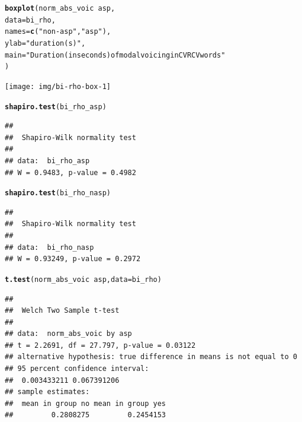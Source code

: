 \documentclass[a4paper,11pt]{article}\usepackage[]{graphicx}\usepackage[]{color}
\makeatletter
\newcommand{\hlstr}[1]{\textcolor[rgb]{0.192,0.494,0.8}{#1}}%
\newcommand{\hlopt}[1]{\textcolor[rgb]{0,0,0}{#1}}%
\newcommand{\hlstd}[1]{\textcolor[rgb]{0.345,0.345,0.345}{#1}}%
\newcommand{\hlkwc}[1]{\textcolor[rgb]{0.333,0.667,0.333}{#1}}%
\newcommand{\hlkwd}[1]{\textcolor[rgb]{0.737,0.353,0.396}{\textbf{#1}}}%
\newenvironment{kframe}{%
 \def\at@end@of@kframe{}%
 \ifinner\ifhmode%
  \def\at@end@of@kframe{\end{minipage}}%
  \begin{minipage}{\columnwidth}%
 \fi\fi%
 \def\FrameCommand##1{\hskip\@totalleftmargin \hskip-\fboxsep
 \colorbox{shadecolor}{##1}\hskip-\fboxsep
     \hskip-\linewidth \hskip-\@totalleftmargin \hskip\columnwidth}%
 \MakeFramed {\advance\hsize-\width
   \@totalleftmargin\z@ \linewidth\hsize
   \@setminipage}}%
 {\par\unskip\endMakeFramed%
 \at@end@of@kframe}
\newenvironment{knitrout}{}{} %
\makeatother
\begin{document}
\begin{knitrout}
\color{fgcolor}\begin{kframe}
\begin{alltt}
\hlkwd{boxplot}\hlstd{(norm_abs_voic} \hlopt{~} \hlstd{asp,}
        \hlkwc{data} \hlstd{= bi_rho,}
        \hlkwc{names} \hlstd{=} \hlkwd{c}\hlstd{(}\hlstr{"non-asp"}\hlstd{,} \hlstr{"asp"}\hlstd{),}
        \hlkwc{ylab} \hlstd{=} \hlstr{"duration (s)"}\hlstd{,}
        \hlkwc{main} \hlstd{=} \hlstr{"Duration (in seconds) of modal voicing in CVRCV words"}
        \hlstd{)}
\end{alltt}
\end{kframe}

{\centering \texttt{[image: img/bi-rho-box-1]} 

}



\end{knitrout}

\begin{knitrout}
\color{fgcolor}\begin{kframe}
\begin{alltt}
\hlkwd{shapiro.test}\hlstd{(bi_rho_asp)}
\end{alltt}
\begin{verbatim}
## 
## 	Shapiro-Wilk normality test
## 
## data:  bi_rho_asp
## W = 0.9483, p-value = 0.4982
\end{verbatim}
\begin{alltt}
\hlkwd{shapiro.test}\hlstd{(bi_rho_nasp)}
\end{alltt}
\begin{verbatim}
## 
## 	Shapiro-Wilk normality test
## 
## data:  bi_rho_nasp
## W = 0.93249, p-value = 0.2972
\end{verbatim}
\begin{alltt}
\hlkwd{t.test}\hlstd{(norm_abs_voic} \hlopt{~} \hlstd{asp,} \hlkwc{data} \hlstd{= bi_rho)}
\end{alltt}
\begin{verbatim}
## 
## 	Welch Two Sample t-test
## 
## data:  norm_abs_voic by asp
## t = 2.2691, df = 27.797, p-value = 0.03122
## alternative hypothesis: true difference in means is not equal to 0
## 95 percent confidence interval:
##  0.003433211 0.067391206
## sample estimates:
##  mean in group no mean in group yes 
##         0.2808275         0.2454153
\end{verbatim}
\end{kframe}
\end{knitrout}
\end{document}
